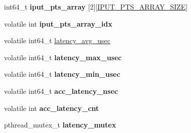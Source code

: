 {\bf }\par
\begin{DoxyCompactItemize}
\item 
int64\+\_\+t {\bfseries iput\+\_\+pts\+\_\+array} \mbox{[}2\mbox{]}\mbox{[}\hyperlink{proc_8h_af53db00bc88282285037381807cc5c1d}{I\+P\+U\+T\+\_\+\+P\+T\+S\+\_\+\+A\+R\+R\+A\+Y\+\_\+\+S\+I\+ZE}\mbox{]}\hypertarget{structproc__ctx__s_afe00d8671976a864711e0db2841c5964}{}\label{structproc__ctx__s_afe00d8671976a864711e0db2841c5964}

\item 
volatile int {\bfseries iput\+\_\+pts\+\_\+array\+\_\+idx}\hypertarget{structproc__ctx__s_a143dc31fd44936ccafe2ecdaeef20ad6}{}\label{structproc__ctx__s_a143dc31fd44936ccafe2ecdaeef20ad6}

\end{DoxyCompactItemize}

{\bf }\par
\begin{DoxyCompactItemize}
\item 
volatile int64\+\_\+t \hyperlink{structproc__ctx__s_acdd3cc73dadcf7eb7c70c6e5ffb53293}{latency\+\_\+avg\+\_\+usec}
\item 
volatile int64\+\_\+t {\bfseries latency\+\_\+max\+\_\+usec}\hypertarget{structproc__ctx__s_a5cbe8711ddd1b36a2b203cfc8ef1b01f}{}\label{structproc__ctx__s_a5cbe8711ddd1b36a2b203cfc8ef1b01f}

\item 
volatile int64\+\_\+t {\bfseries latency\+\_\+min\+\_\+usec}\hypertarget{structproc__ctx__s_a0546eedba9aabcc7edc958f1ccc8cd42}{}\label{structproc__ctx__s_a0546eedba9aabcc7edc958f1ccc8cd42}

\item 
volatile int64\+\_\+t {\bfseries acc\+\_\+latency\+\_\+nsec}\hypertarget{structproc__ctx__s_a58e7e20b896b1d74789f2fe9b971fd09}{}\label{structproc__ctx__s_a58e7e20b896b1d74789f2fe9b971fd09}

\item 
volatile int {\bfseries acc\+\_\+latency\+\_\+cnt}\hypertarget{structproc__ctx__s_a3dea6eaed00798ceac47451e5923dc41}{}\label{structproc__ctx__s_a3dea6eaed00798ceac47451e5923dc41}

\item 
pthread\+\_\+mutex\+\_\+t {\bfseries latency\+\_\+mutex}\hypertarget{structproc__ctx__s_ac9705b88786b067a17f84178d52bbce1}{}\label{structproc__ctx__s_ac9705b88786b067a17f84178d52bbce1}

\end{DoxyCompactItemize}

